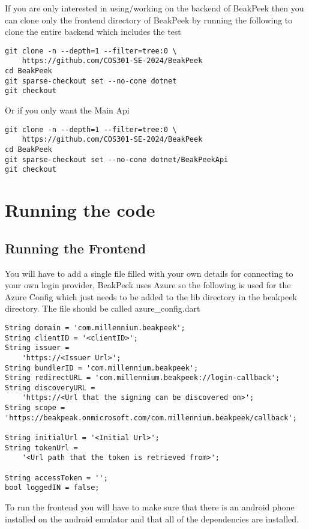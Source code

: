 \documentclass{article}
\begin{document}
If you are only interested in using/working on the backend of BeakPeek then you
can clone only the frontend directory of BeakPeek by running the following to
clone the entire backend which includes the test

\begin{lstlisting}
git clone -n --depth=1 --filter=tree:0 \
    https://github.com/COS301-SE-2024/BeakPeek
cd BeakPeek
git sparse-checkout set --no-cone dotnet
git checkout
\end{lstlisting}

Or if you only want the Main Api

\begin{lstlisting}
git clone -n --depth=1 --filter=tree:0 \
    https://github.com/COS301-SE-2024/BeakPeek
cd BeakPeek
git sparse-checkout set --no-cone dotnet/BeakPeekApi
git checkout
\end{lstlisting}

\section{Running the code}

\subsection{Running the Frontend}

You will have to add a single file filled with your own details for connecting
to your own login provider, BeakPeek uses Azure so the following is used for the
Azure Config which just needs to be added to the lib directory in the beakpeek
directory. The file should be called azure_config.dart

\begin{lstlisting}
String domain = 'com.millennium.beakpeek';
String clientID = '<clientID>';
String issuer =
    'https://<Issuer Url>';
String bundlerID = 'com.millennium.beakpeek';
String redirectURL = 'com.millennium.beakpeek://login-callback';
String discoveryURL =
    'https://<Url that the signing can be discovered on>';
String scope = 'https://beakpeak.onmicrosoft.com/com.millennium.beakpeek/callback';

String initialUrl = '<Initial Url>';
String tokenUrl =
    '<Url path that the token is retrieved from>';

String accessToken = '';
bool loggedIN = false;
\end{lstlisting}

To run the frontend you will have to make sure that there is an android phone
installed on the android emulator and that all of the dependencies are
installed.
\end{document}

